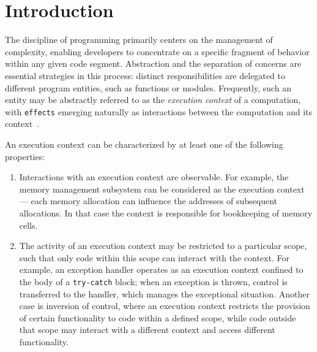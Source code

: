 \documentclass[acmsmall]{acmart}
\begin{document}



\maketitle


\section{Introduction} \label{sec:intro}


The discipline of programming primarily centers on the management of complexity, enabling developers to concentrate on a specific fragment of behavior within any given code segment.
Abstraction and the separation of concerns are essential strategies in this process: distinct responsibilities are delegated to different program entities, such as functions or modules.
Frequently, such an entity may be abstractly referred to as the \textit{execution context} of a computation, with \texttt{effects} emerging naturally as interactions between the computation and its context~\cite{kiselyov2013extensible}.

An execution context can be characterized by at least one of the following properties:
\begin{enumerate}
    \item Interactions with an execution context are observable.
    For example, the memory management subsystem can be considered as the execution context --- each memory allocation can influence the addresses of subsequent allocations.
    In that case the context is responsible for bookkeeping of memory cells.
    \item The activity of an execution context may be restricted to a particular scope, such that only code within this scope can interact with the context.
    For example, an exception handler operates as an execution context confined to the body of a \texttt{try-catch} block; when an exception is thrown, control is transferred to the handler, which manages the exceptional situation.
    Another case is inversion of control, where an execution context restricts the provision of certain functionality to code within a defined scope, while code outside that scope may interact with a different context and access different functionality.
\end{enumerate}
\end{document}
